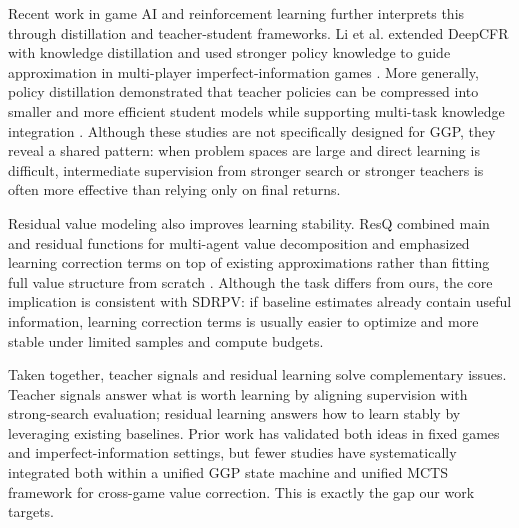 Recent work in game AI and reinforcement learning further interprets this through distillation and teacher-student frameworks. Li et al. extended DeepCFR with knowledge distillation and used stronger policy knowledge to guide approximation in multi-player imperfect-information games \cite{li2023kdbd2cfr}. More generally, policy distillation demonstrated that teacher policies can be compressed into smaller and more efficient student models while supporting multi-task knowledge integration \cite{rusu2015policy}. Although these studies are not specifically designed for GGP, they reveal a shared pattern: when problem spaces are large and direct learning is difficult, intermediate supervision from stronger search or stronger teachers is often more effective than relying only on final returns.


Residual value modeling also improves learning stability. ResQ combined main and residual functions for multi-agent value decomposition and emphasized learning correction terms on top of existing approximations rather than fitting full value structure from scratch \cite{shen2022resq}. Although the task differs from ours, the core implication is consistent with SDRPV: if baseline estimates already contain useful information, learning correction terms is usually easier to optimize and more stable under limited samples and compute budgets.


Taken together, teacher signals and residual learning solve complementary issues. Teacher signals answer what is worth learning by aligning supervision with strong-search evaluation; residual learning answers how to learn stably by leveraging existing baselines. Prior work has validated both ideas in fixed games and imperfect-information settings, but fewer studies have systematically integrated both within a unified GGP state machine and unified MCTS framework for cross-game value correction. This is exactly the gap our work targets.

